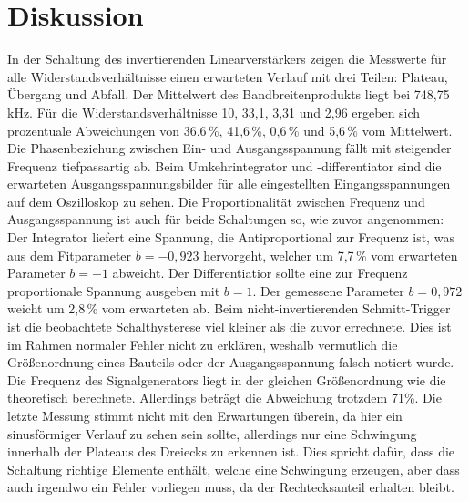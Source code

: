 \section{Diskussion}
\label{sec:Diskussion}

        In der Schaltung des invertierenden Linearverstärkers zeigen die Messwerte für alle Widerstandsverhältnisse 
        einen erwarteten Verlauf mit drei Teilen: Plateau, Übergang und Abfall. 
        Der Mittelwert des Bandbreitenprodukts liegt bei 748,75\,kHz. Für die Widerstandsverhältnisse 10, 33,1, 3,31 und 
        2,96 ergeben sich prozentuale Abweichungen von 36,6\,\%, 41,6\,\%, 0,6\,\% und 5,6\,\% vom Mittelwert.
        Die Phasenbeziehung zwischen Ein- und 
        Ausgangsspannung fällt mit steigender Frequenz tiefpassartig ab. Beim Umkehrintegrator und -differentiator 
        sind die erwarteten Ausgangsspannungsbilder für alle eingestellten Eingangsspannungen auf dem 
        Oszilloskop zu sehen. Die Proportionalität zwischen Frequenz und Ausgangsspannung ist auch für beide Schaltungen so,
        wie zuvor angenommen: Der Integrator liefert eine Spannung, die Antiproportional zur Frequenz ist, was
        aus dem Fitparameter $b=-0,923$ hervorgeht, welcher um 7,7\,\% vom erwarteten Parameter $b=-1$ abweicht.
        Der Differentiatior sollte eine zur Frequenz proportionale Spannung ausgeben mit $b=1$. Der 
        gemessene Parameter $b=0,972$ weicht um 2,8\,\% vom erwarteten ab.
        Beim nicht-invertierenden Schmitt-Trigger ist die beobachtete Schalthysterese 
        viel kleiner als die zuvor errechnete. Dies ist im Rahmen normaler Fehler nicht zu erklären, weshalb vermutlich 
        die Größenordnung eines Bauteils oder der Ausgangsspannung falsch notiert wurde. Die Frequenz 
        des Signalgenerators liegt in der gleichen Größenordnung wie die theoretisch berechnete. 
        Allerdings beträgt die Abweichung trotzdem 71\%. 
        Die letzte Messung stimmt nicht mit den Erwartungen überein, da hier ein sinusförmiger Verlauf 
        zu sehen sein sollte, allerdings nur eine Schwingung innerhalb der Plateaus des Dreiecks 
        zu erkennen ist. Dies spricht dafür, dass die Schaltung richtige Elemente enthält, welche 
        eine Schwingung erzeugen, aber dass auch irgendwo ein Fehler vorliegen muss, da der Rechtecksanteil 
        erhalten bleibt. 